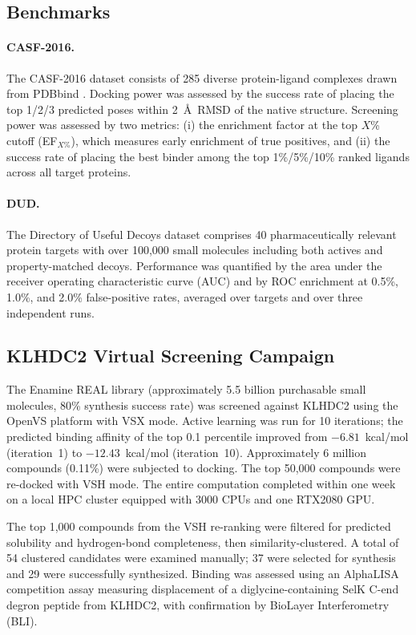 \documentclass[10pt]{article}
\begin{document}
\subsection{Benchmarks}

\paragraph{CASF-2016.}
The CASF-2016 dataset \citep{su2019casf2016} consists of 285 diverse
protein-ligand complexes drawn from PDBbind \citep{liu2017pdbbind}. Docking
power was assessed by the success rate of placing the top 1/2/3 predicted
poses within 2~\AA\ RMSD of the native structure. Screening power was
assessed by two metrics: (i) the enrichment factor at the top $X$\% cutoff
(EF$_{X\%}$), which measures early enrichment of true positives, and (ii) the
success rate of placing the best binder among the top 1\%/5\%/10\% ranked
ligands across all target proteins.

\paragraph{DUD.}
The Directory of Useful Decoys dataset \citep{mysinger2012dude} comprises
40 pharmaceutically relevant protein targets with over 100,000 small
molecules including both actives and property-matched decoys. Performance was
quantified by the area under the receiver operating characteristic curve (AUC)
and by ROC enrichment at 0.5\%, 1.0\%, and 2.0\% false-positive rates,
averaged over targets and over three independent runs.

\subsection{KLHDC2 Virtual Screening Campaign}

The Enamine REAL library (approximately 5.5 billion purchasable small molecules,
80\% synthesis success rate) was screened against KLHDC2 using the OpenVS
platform with VSX mode. Active learning was run for 10 iterations; the
predicted binding affinity of the top 0.1 percentile improved from
$-6.81$~kcal/mol (iteration~1) to $-12.43$~kcal/mol (iteration~10).
Approximately 6 million compounds (0.11\%) were subjected to docking. The
top 50,000 compounds were re-docked with VSH mode. The entire computation
completed within one week on a local HPC cluster equipped with 3000 CPUs and
one RTX2080 GPU.

The top 1,000 compounds from the VSH re-ranking were filtered for predicted
solubility and hydrogen-bond completeness, then similarity-clustered. A total
of 54 clustered candidates were examined manually; 37 were selected for
synthesis and 29 were successfully synthesized. Binding was assessed using an
AlphaLISA competition assay measuring displacement of a diglycine-containing
SelK C-end degron peptide from KLHDC2, with confirmation by BioLayer
Interferometry (BLI).
\end{document}

